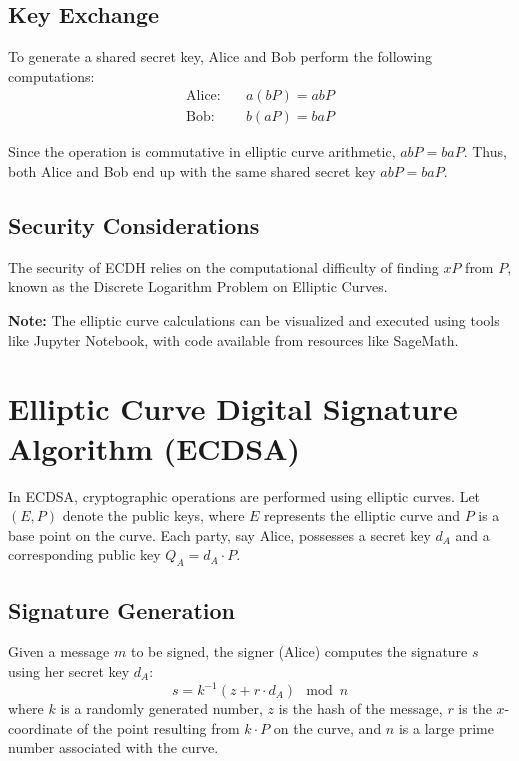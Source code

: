 \documentclass[11pt]{article}
\begin{document}
\subsection{Key Exchange}

To generate a shared secret key, Alice and Bob perform the following computations:
\begin{align*}
    \text{Alice:} & \quad a(bP) = abP \\
    \text{Bob:} & \quad b(aP) = baP
\end{align*}

Since the operation is commutative in elliptic curve arithmetic, \(abP = baP\). Thus, both Alice and Bob end up with the same shared secret key \(abP = baP\).

\subsection{Security Considerations}

The security of ECDH relies on the computational difficulty of finding \(xP\) from \(P\), known as the Discrete Logarithm Problem on Elliptic Curves.

\textbf{Note:} The elliptic curve calculations can be visualized and executed using tools like Jupyter Notebook, with code available from resources like SageMath.

\section{Elliptic Curve Digital Signature Algorithm (ECDSA)}

In ECDSA, cryptographic operations are performed using elliptic curves. Let \((E, P)\) denote the public keys, where \(E\) represents the elliptic curve and \(P\) is a base point on the curve. Each party, say Alice, possesses a secret key \(d_A\) and a corresponding public key \(Q_A = d_A \cdot P\).

\subsection{Signature Generation}

Given a message \(m\) to be signed, the signer (Alice) computes the signature \(s\) using her secret key \(d_A\):
\[ s = k^{-1} (z + r \cdot d_A) \mod n \]
where \(k\) is a randomly generated number, \(z\) is the hash of the message, \(r\) is the \(x\)-coordinate of the point resulting from \(k \cdot P\) on the curve, and \(n\) is a large prime number associated with the curve.
\end{document}
